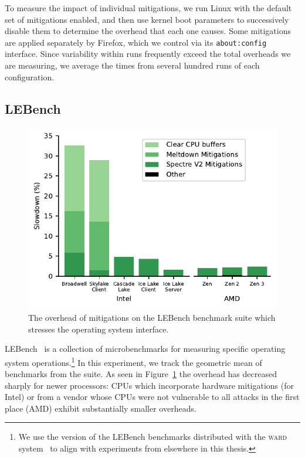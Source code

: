 To measure the impact of individual mitigations, we run  Linux with the default set of mitigations enabled, and then use kernel boot parameters to successively disable them to determine the overhead that each one causes.
Some mitigations are applied separately by Firefox, which we control via its \texttt{about:config} interface.
Since variability within runs frequently exceed the total overheads we are measuring, we average the times from several hundred runs of each configuration.


\subsection{LEBench}

\begin{figure}[t]
    \includegraphics[width=\columnwidth]{plots/lebench.pdf}
    \caption{The overhead of mitigations on the LEBench benchmark suite which stresses the operating system interface.}
    \label{fig:lebench}
\end{figure}


LEBench~\cite{ren:lebench} is a collection of microbenchmarks for measuring specific operating system operations.\footnote{We use the version of the LEBench benchmarks distributed with the \textsc{ward} system~\cite{behrens:ward} to align with experiments from elsewhere in this thesis.}
In this experiment, we track the geometric mean of benchmarks from the suite.
As seen in Figure~\ref{fig:lebench} the overhead has decreased sharply for newer processors:
CPUs which incorporate hardware mitigations (for Intel) or from a vendor whose CPUs were not vulnerable to all attacks in the first place (AMD) exhibit substantially smaller overheads.

